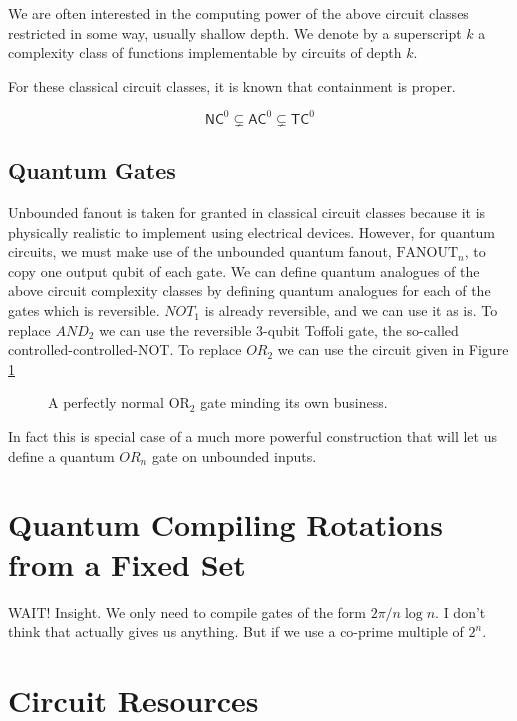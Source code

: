 \begin{equation}
\end{equation}

We are often interested in the computing power of the above
circuit classes restricted in some way, usually shallow depth.
We denote by a superscript $k$ a complexity class of
functions implementable by circuits of depth $k$.

For these classical circuit classes, it is known that containment
is proper.

\begin{equation}
\textsf{NC}^0 \subsetneq \textsf{AC}^0 \subsetneq \textsf{TC}^0
\end{equation}

\subsection{Quantum Gates}

Unbounded fanout is taken for granted in classical circuit classes
because it is physically realistic to implement using electrical
devices. However, for quantum circuits, we must make use of the
unbounded quantum fanout, $\text{FANOUT}_n$, to copy one output
qubit of each gate.
We can define quantum analogues of the above circuit complexity 
classes by defining quantum analogues for each of the gates which
is reversible.
$NOT_1$ is already reversible, and we can use it as is.
To replace $AND_2$ we can use the reversible $3$-qubit Toffoli gate,
the so-called controlled-controlled-NOT.
To replace $OR_2$ we can use the circuit given in
Figure \ref{fig:or2}

\begin{figure}
\caption{A perfectly normal $\text{OR}_2$ gate minding its own business.}
\label{fig:or2}
\end{figure}

In fact this is special case of a much more powerful construction
that will let us define a quantum $OR_n$ gate on unbounded inputs.

\section{Quantum Compiling Rotations from a Fixed Set}

WAIT! Insight. We only need to compile gates of the form
$2\pi / n\log n$. I don't think that actually gives us anything.
But if we use a co-prime multiple of $2^n$.

\section{Circuit Resources}
